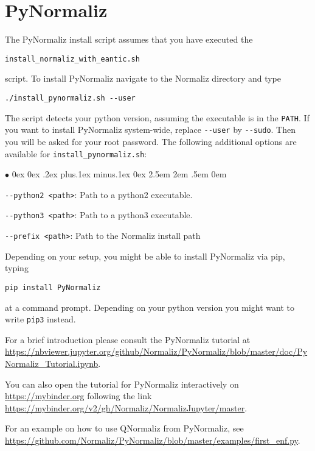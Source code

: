 \documentclass[12pt,a4paper]{scrartcl}
\newcommand{\stdli}{ \topsep0ex \partopsep0ex %
\parsep.2ex plus.1ex minus.1ex \itemsep0ex%
\leftmargin2.5em \labelwidth2em \labelsep.5em \rightmargin0em}%
\renewenvironment{itemize}{\begin{list}{{$\bullet$}}{\stdli}}{\end{list}}
\theoremstyle{definition}
\begin{document}
\section{PyNormaliz}\label{PyNormaliz}
The PyNormaliz install script assumes that you have executed the
\begin{center}
\verb|install_normaliz_with_eantic.sh|
\end{center}
script. To install PyNormaliz navigate to the Normaliz directory and type
\begin{Verbatim}
./install_pynormaliz.sh --user
\end{Verbatim}
The script detects your python version, assuming the executable is in the \verb|PATH|. If you want to install PyNormaliz system-wide,
replace \verb|--user| by \verb|--sudo|. Then you will be asked for your root password.
The following additional options are available for \verb|install_pynormaliz.sh|:
\begin{itemize}
	\item \verb|--python2 <path>|: Path to a python2 executable.
	\item \verb|--python3 <path>|: Path to a python3 executable.
	\item \verb|--prefix <path>|: Path to the Normaliz install path
\end{itemize}

Depending on your setup, you might be able to install PyNormaliz via pip, typing
\begin{Verbatim}
pip install PyNormaliz
\end{Verbatim}
at a command prompt. Depending on your python version you might want to write \verb|pip3| instead.


For a brief introduction please consult the PyNormaliz tutorial at \url{https://nbviewer.jupyter.org/github/Normaliz/PyNormaliz/blob/master/doc/PyNormaliz_Tutorial.ipynb}.

You can also open the tutorial for PyNormaliz interactively on \url{https://mybinder.org} following the link \url{https://mybinder.org/v2/gh/Normaliz/NormalizJupyter/master}.

For an example on how to use QNormaliz from PyNormaliz, see \url{https://github.com/Normaliz/PyNormaliz/blob/master/examples/first_enf.py}.
\end{document}
